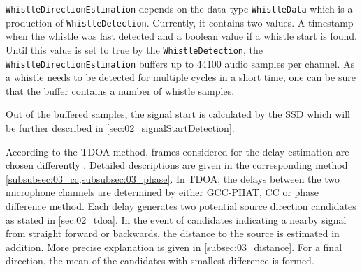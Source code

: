 \lstinline!WhistleDirectionEstimation! depends on the data type \lstinline!WhistleData!
which is a production of \lstinline!WhistleDetection!. 
Currently, it contains two values. A timestamp when the whistle was last detected
and a boolean value if a whistle start is found.
Until this value is set to true by the \lstinline!WhistleDetection!, the
\lstinline!WhistleDirectionEstimation! buffers up to
44100 audio samples per channel.
As a whistle needs to be detected for multiple cycles in a short time, one can
be sure that the buffer contains a number of whistle samples.

Out of the buffered samples, the signal start is calculated by the \ac{SSD}
which will be further described in \cref{sec:02_signalStartDetection}. 

According to the \ac{TDOA} method, frames considered for the delay estimation
are chosen differently .
Detailed descriptions are given in the corresponding method
\cref{subsubsec:03_cc,subsubsec:03_phase}.
In \ac{TDOA}, the delays between the two microphone channels are
determined by either \ac{GCC-PHAT}, \ac{CC} or phase difference method. 
Each delay generates two potential source direction candidates as stated
in \cref{sec:02_tdoa}.
In the event of candidates indicating a nearby signal from straight forward or
backwards, the distance to the source is estimated in addition.
More precise explanation is given in \cref{subsec:03_distance}.
For a final direction, the mean of the candidates with smallest difference
is formed. 

